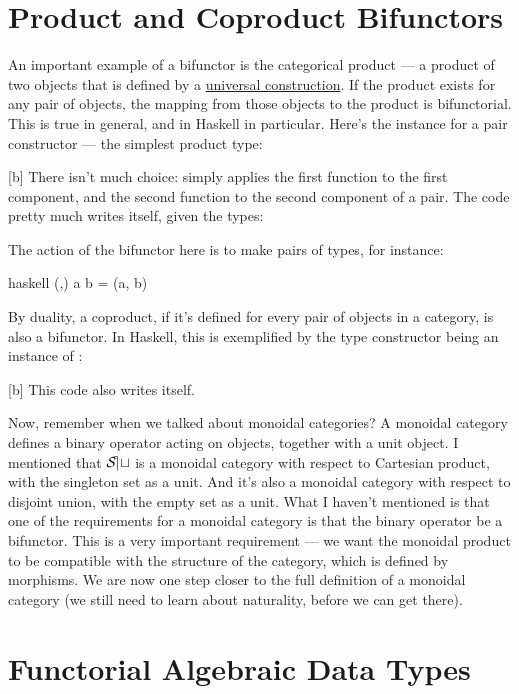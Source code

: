 \section{Product and Coproduct Bifunctors}

An important example of a bifunctor is the categorical product --- a
product of two objects that is defined by a \hyperref[products-and-coproducts]{universal
construction}. If the product exists for any pair of objects, the
mapping from those objects to the product is bifunctorial. This is true
in general, and in Haskell in particular. Here's the 
instance for a pair constructor --- the simplest product type:

[b]
There isn't much choice:  simply applies the first
function to the first component, and the second function to the second
component of a pair. The code pretty much writes itself, given the
types:

The action of the bifunctor here is to make pairs of types, for
instance:

\begin{snip}{haskell}
(,) a b = (a, b)
\end{snip}
By duality, a coproduct, if it's defined for every pair of objects in a
category, is also a bifunctor. In Haskell, this is exemplified by the
 type constructor being an instance of
:

[b]
This code also writes itself.

Now, remember when we talked about monoidal categories? A monoidal
category defines a binary operator acting on objects, together with a
unit object. I mentioned that $\mathcal{S\mkern-3mu et}$ is a monoidal category with
respect to Cartesian product, with the singleton set as a unit. And it's
also a monoidal category with respect to disjoint union, with the empty
set as a unit. What I haven't mentioned is that one of the requirements
for a monoidal category is that the binary operator be a bifunctor. This
is a very important requirement --- we want the monoidal product to be
compatible with the structure of the category, which is defined by
morphisms. We are now one step closer to the full definition of a
monoidal category (we still need to learn about naturality, before we
can get there).

\section{Functorial Algebraic Data Types}

